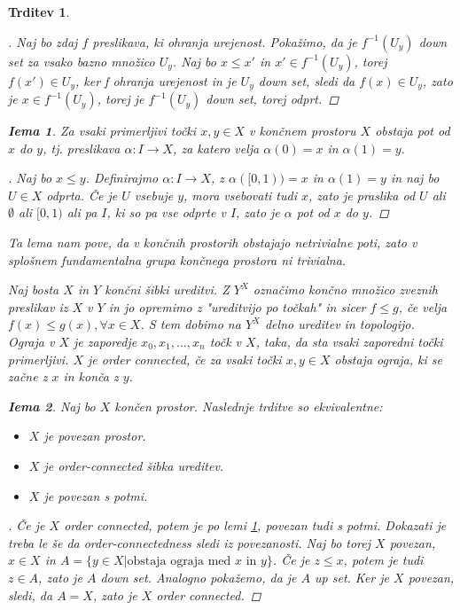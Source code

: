 \documentclass[a4paper,12pt]{article}
\theoremstyle{definition}
\theoremstyle{plain}
\theoremstyle{definition}
\theoremstyle{plain}
\newtheorem{trditev}{Trditev}
\theoremstyle{plain}
\theoremstyle{plain}
\theoremstyle{plain}
\newtheorem{lema}{Iema}
\newenvironment{dokaz}{\begin{proof}[\bfseries\upshape\proofname]}{\end{proof}}
\begin{document}
\begin{trditev}
\begin{dokaz}
    Naj bo zdaj $f$ preslikava, ki ohranja urejenost. Pokažimo, da je $f^{-1}(U_y)$ down set za vsako bazno množico $U_y$. Naj bo $x\leq x'$ in $x'\in f^{-1}(U_y)$, torej $f(x') \in U_y$, ker f ohranja urejenost in je $U_y$ down set, sledi da $f(x)\in U_y$, zato je $x\in f^{-1}(U_y)$, torej je $f^{-1}(U_y)$ down set, torej odprt.


\end{dokaz}


\begin{lema}\label{lem:pot}
    Za vsaki primerljivi točki $x,y\in X$ v končnem prostoru $X$ obstaja pot od $x$ do $y$, tj. preslikava $\alpha: I \rightarrow X$, za katero velja $\alpha(0)=x$ in $\alpha(1)=y$.

\end{lema}
\begin{dokaz}
    Naj bo $x \leq y$. Definirajmo $\alpha:I\rightarrow X$, z $\alpha([0,1))=x$ in $\alpha(1)=y$ in naj bo $U\in X$ odprta. Če je $U$ vsebuje $y$, mora vsebovati tudi $x$, 
    zato je praslika od $U$ ali $\emptyset$ ali $[0,1)$ ali pa $I$, ki so pa vse odprte v $I$, zato je $\alpha$ pot od $x$ do $y$.
\end{dokaz}
Ta lema nam pove, da v končnih prostorih obstajajo netrivialne poti, zato v splošnem fundamentalna grupa končnega prostora ni trivialna.

Naj bosta $X$ in $Y$ končni šibki ureditvi. Z $Y^X$ označimo končno množico zveznih preslikav iz $X$ v $Y$ in jo opremimo z "ureditvijo po točkah" in sicer $f\leq g$, če velja $f(x) \leq g(x), \forall x\in X$. S tem dobimo na $Y^X$ delno ureditev in topologijo. \textit{Ograja} v $X$ je zaporedje $x_0,x_1,...,x_n$ točk v $X$, taka, da sta vsaki zaporedni točki primerljivi. $X$ je \textit{order 
connected}, če za vsaki točki $x,y\in X$ obstaja ograja, ki se začne z $x$ in konča z $y$.
\begin{lema}
    Naj bo $X$ končen prostor. Naslednje trditve so ekvivalentne:

    \begin{itemize}
        \label{lem:povezanost}
        \item $X$ je povezan prostor.
        \item $X$ je order-connected šibka ureditev.
        \item $X$ je povezan s potmi.
    \end{itemize}
\end{lema}


\begin{dokaz}
    Če je $X$ order connected, potem je po lemi \ref{lem:pot}, povezan tudi s potmi.
    Dokazati je treba le še da order-connectedness sledi iz povezanosti. Naj bo torej $X$ povezan, $x\in X$ in $A=\{y\in X| \text{obstaja ograja med $x$ in $y$}\}$. Če 
    je $z\leq x$, potem je tudi $z\in A$, zato je $A$ down set. Analogno pokažemo, da je $A$ up set. Ker je $X$ povezan, sledi, da $A=X$, zato je $X$ order connected.
\end{dokaz}


\end{trditev}
\end{document}
